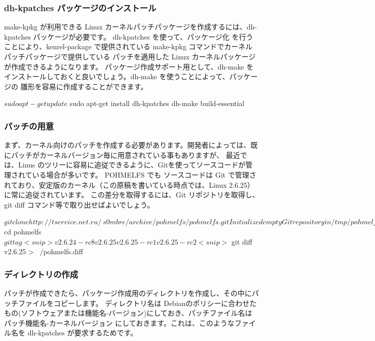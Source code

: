 \documentclass[mingoth,a4paper]{jsarticle}
\begin{document}
\subsubsection{dh-kpatches パッケージのインストール}
make-kpkg が利用できる Linux カーネルパッチパッケージを作成するには、dh-kpatches パッケージが必要です。
dh-kpatches を使って、パッケージ化
を行うことにより、kenrel-package で提供されている make-kpkg コマンドでカーネルパッチパッケージで提供している
パッチを適用した Linux カーネルパッケージが作成できるようになります。
パッケージ作成サポート用として、dh-make をインストールしておくと良いでしょう。dh-make を使うことによって、パッケージの
雛形を容易に作成することができます。
\begin{commandline}
$ sudo apt-get update
$ sudo apt-get install dh-kpatches dh-make build-essential
\end{commandline}

\subsubsection{パッチの用意}
まず、カーネル向けのパッチを作成する必要があります。開発者によっては、既にパッチがカーネルバージョン毎に用意されている事もありますが、
最近では、Linus のツリーに容易に追従できるように、Gitを使ってソースコードが管理されている場合が多いです。
POHMELFS でも ソースコードは Git で管理されており、安定版のカーネル（この原稿を書いている時点では、Linux 2.6.25）に常に追従されています。
この差分を取得するには、Git リポジトリを取得し、git diff コマンド等で取り出せばよいでしょう。

\begin{commandline}
$ git clone http://tservice.net.ru/~s0mbre/archive/pohmelfs/pohmelfs.git
Initialized empty Git repository in /tmp/pohmelfs/.git/
got 37e1b82c0535386cf09b3821dff5e8cb5f9e26b4
walk 37e1b82c0535386cf09b3821dff5e8cb5f9e26b4
<snip>
$ cd pohmelfs
$ git tag
<snip>
v2.6.24-rc8
v2.6.25
v2.6.25-rc1
v2.6.25-rc2
<snip>
$ git diff v2.6.25 > ~/pohmelfs.diff
\end{commandline}

\subsubsection{ディレクトリの作成}

パッチが作成できたら、パッケージ作成用のディレクトリを作成し、その中にパッチファイルをコピーします。
ディレクトリ名は Debianのポリシーに合わせたもの(ソフトウェアまたは機能名-バージョン)にしておき、パッチファイル名は
パッチ機能名-カーネルバージョン にしておきます。これは、このようなファイル名を dh-kpatches が要求するためです。
\end{document}
